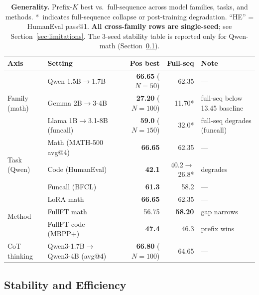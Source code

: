 \documentclass[10pt]{article}
\begin{document}
\begin{table}[t]
\centering
\caption{\textbf{Generality.} Prefix-$K$ best vs.\ full-sequence across model families, tasks, and methods. {\color{red!70!black}*}~indicates full-sequence collapse or post-training degradation. ``HE'' = HumanEval pass@1. \textbf{All cross-family rows are single-seed}; see Section~\ref{sec:limitations}. The 3-seed stability table is reported only for Qwen-math (Section~\ref{sec:stability}).}
\label{tab:generality}
\small
\begin{tabular}{@{}llrrl@{}}
\toprule
\textbf{Axis} & \textbf{Setting} & \textbf{Pos best} & \textbf{Full-seq} & \textbf{Note} \\
\midrule
\multirow{3}{*}{Family (math)}
 & Qwen 1.5B$\to$1.7B               & \textbf{66.65} ($N{=}50$)  & 62.35              & --- \\
 & Gemma 2B$\to$3-4B                & \textbf{27.20} ($N{=}100$) & 11.70{\color{red!70!black}*} & full-seq below 13.45 baseline \\
 & Llama 1B$\to$3.1-8B (funcall)   & \textbf{59.0}\phantom{0} ($N{=}150$) & 32.0{\color{red!70!black}*} & full-seq degrades (funcall) \\
\midrule
\multirow{3}{*}{Task (Qwen)}
 & Math (MATH-500 avg@4)            & \textbf{66.65}             & 62.35              & --- \\
 & Code (HumanEval)                 & \textbf{42.1}\phantom{0}   & 40.2$\to$26.8{\color{red!70!black}*} & degrades \\
 & Funcall (BFCL)                   & \textbf{61.3}\phantom{0}   & 58.2               & --- \\
\midrule
\multirow{3}{*}{Method}
 & LoRA math                        & \textbf{66.65}             & 62.35              & --- \\
 & FullFT math                      & 56.75                       & \textbf{58.20}     & gap narrows \\
 & FullFT code (MBPP+)              & \textbf{47.4}\phantom{0}   & 46.3               & prefix wins \\
\midrule
CoT thinking & Qwen3-1.7B$\to$Qwen3-4B (avg@4) & \textbf{66.80} ($N{=}100$) & 64.65 & --- \\
\bottomrule
\end{tabular}
\end{table}

\subsection{Stability and Efficiency}
\label{sec:stability}
\end{document}
